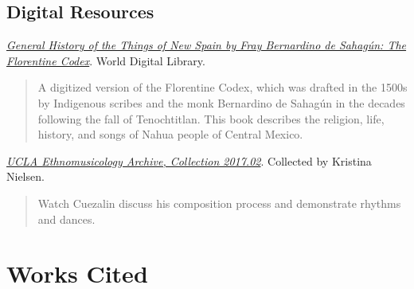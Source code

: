 \documentclass[twoside]{article}
\begin{document}
\hypertarget{digital-resources}{%
\subsection*{Digital Resources}\label{digital-resources}}

 \emph{\href{https://www.wdl.org/en/item/10096/}{General
History of the Things of New Spain by Fray Bernardino de Sahagún: The
Florentine Codex}}. World Digital Library.

\begin{quote}
A digitized version of the Florentine Codex, which was drafted in the
1500s by Indigenous scribes and the monk Bernardino de Sahagún in the
decades following the fall of Tenochtitlan. This book describes the
religion, life, history, and songs of Nahua people of Central Mexico.
\end{quote}


 \href{https://archive.org/details/calauem_201702_item_16_6-9/DSC_0003_Cuezalin+talking+about+and+playing+Maquil+Xochitl+and+Nayeli.MOV}{\emph{UCLA
Ethnomusicology Archive, Collection 2017.02}}. Collected by Kristina
Nielsen.

\begin{quote}
Watch Cuezalin discuss his composition process and demonstrate rhythms
and dances.
\end{quote}

\hypertarget{works-cited}{%
\section*{Works Cited}\label{works-cited}}
\end{document}

